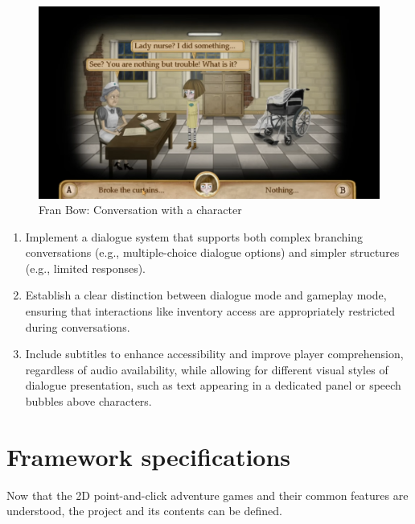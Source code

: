 \begin{figure}[H]
\centering
\includegraphics[width=.8\linewidth]{img/D-FB.png}
\caption{Fran Bow: Conversation with a character}
\label{fig:D-FranBow}
\end{figure}


\begin{enumerate}

    \item Implement a dialogue system that supports both complex branching conversations (e.g., multiple-choice dialogue options) and simpler structures (e.g., limited responses).
    \item Establish a clear distinction between dialogue mode and gameplay mode, ensuring that interactions like inventory access are appropriately restricted during conversations.
    \item Include subtitles to enhance accessibility and improve player comprehension, regardless of audio availability, while allowing for different visual styles of dialogue presentation, such as text appearing in a dedicated panel or speech bubbles above characters. 

\end{enumerate}


\section{Framework specifications}
Now that the 2D point-and-click adventure games and their common features are understood, the project and its contents can be defined. 

